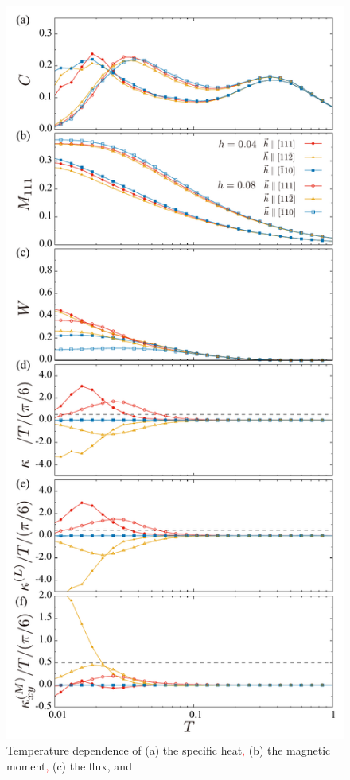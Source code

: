 \documentclass[twocolumn,superscriptaddress,showpacs, longbibliography, aps, prb]{revtex4-2}
\newcommand{\red}[1]{\textcolor{red}{#1}}
\begin{document}
\begin{figure}[htb]
  \begin{center}
    \includegraphics[width=0.9\linewidth]{Figs/plot_all_ab.pdf}
  \end{center}  
  \caption{Temperature dependence of (a) the specific heat\red{,} (b) the magnetic moment\red{,} (c) the flux, and %
}
\end{figure}
\end{document}
